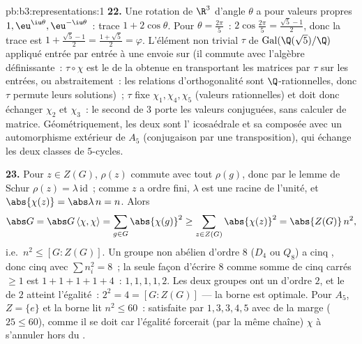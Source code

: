\begin{solution}{pb:b3:representations:1}
\textbf{22.} Une rotation de $\R^3$ d'angle $\theta$ a pour
valeurs propres $1, \eu^{\iu\theta}, \eu^{-\iu\theta}$~: trace
$1 + 2\cos\theta$. Pour $\theta = \frac{2\pi}5$~:
$2\cos\frac{2\pi}5 = \frac{\sqrt5 - 1}2$, donc la trace est $1
+ \frac{\sqrt5-1}2 = \frac{1+\sqrt5}2 = \varphi$. L'élément
non trivial $\tau$ de $\operatorname{Gal}(\Q(\sqrt5)/\Q)$
appliqué entrée par entrée à une  envoie
 sur  (il commute avec l'algèbre
définissante~: $\tau\circ\chi$ est le  de la
 obtenue en transportant les matrices par $\tau$
sur les entrées, ou abstraitement~: les relations
d'orthogonalité sont $\Q$-rationnelles, donc $\tau$ permute
leurs solutions)~; $\tau$ fixe $\chi_1, \chi_4, \chi_5$
(valeurs rationnelles) et doit donc échanger $\chi_2$ et
$\chi_3$~: le second  de  $3$ porte les valeurs
conjuguées, sans calculer de matrice. Géométriquement, les
deux  sont l' icosaédrale et sa
composée avec un automorphisme extérieur de $A_5$
(conjugaison par une transposition), qui échange les deux
classes de $5$-cycles.

\textbf{23.} Pour $z \in Z(G)$, $\rho(z)$ commute avec tout
$\rho(g)$, donc par le lemme de Schur $\rho(z) = \lambda\,
\mathrm{id}$~; comme $z$ a ordre fini, $\lambda$ est une
racine de l'unité, et $\abs{\chi(z)} = \abs\lambda\,n = n$.
Alors
\[
\abs G = \abs G\,\langle\chi, \chi\rangle
= \sum_{g \in G}\abs{\chi(g)}^2
\geq \sum_{z \in Z(G)}\abs{\chi(z)}^2
= \abs{Z(G)}\,n^2,
\]
i.e.\ $n^2 \leq [G : Z(G)]$. Un groupe non abélien d'ordre $8$
($D_4$ ou $Q_8$) a cinq , donc cinq
  avec $\sum n_i^2 = 8$~; la seule façon
d'écrire $8$ comme somme de cinq carrés $\geq 1$ est $1 + 1 +
1 + 1 + 4$~:  $1, 1, 1, 1, 2$. Les deux groupes ont un
 d'ordre $2$, et le  de  $2$ atteint
l'égalité~: $2^2 = 4 = [G : Z(G)]$ --- la borne est optimale.
Pour $A_5$, $Z = \{e\}$ et la borne lit $n^2 \leq 60$~:
satisfaite par $1, 3, 3, 4, 5$ avec de la marge ($25 \leq 60$),
comme il se doit car l'égalité forcerait (par la même chaîne)
$\chi$ à s'annuler hors du .


\end{solution}
